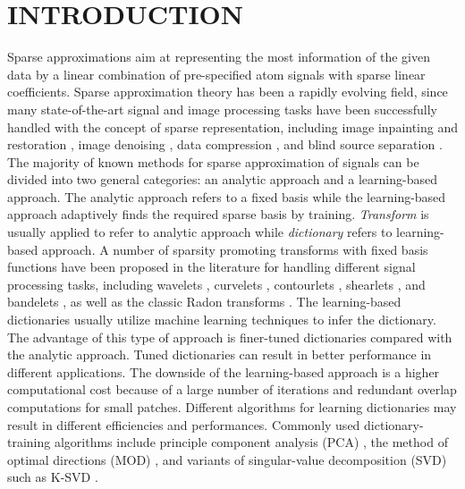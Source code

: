 \section{INTRODUCTION}
Sparse approximations aim at representing the most information of the given data by a linear combination of pre-specified atom signals with sparse linear coefficients. Sparse approximation theory has been a rapidly evolving field, since many state-of-the-art signal and image processing tasks have been successfully handled with the concept of sparse representation, including image inpainting and restoration \cite[]{elad2005,mairal2008,mairal2009,youli2011,jianfeng2013}, image denoising \cite[]{protter2009,jianfeng2013}, data compression \cite[]{bryt2008}, and blind source separation \cite[]{zib2001}. The majority of known methods for sparse approximation of signals can be divided into two general categories: an analytic approach and a learning-based approach. The analytic approach refers to a fixed basis while the learning-based approach adaptively finds the required sparse basis by training. \emph{Transform} is usually applied to refer to analytic approach while \emph{dictionary} refers to learning-based approach. A number of sparsity promoting transforms with fixed basis functions have been proposed in the literature for handling different signal processing tasks, including wavelets \cite[]{sweldens1995,mallat2009}, curvelets \cite[]{candes20061,jianwei2010}, contourlets \cite[]{do2005}, shearlets \cite[]{labate2005}, and bandelets \cite[]{lepennec2005}, as well as the classic Radon transforms \cite[]{amr2014,amr20142}. The learning-based dictionaries usually utilize machine learning techniques to infer the dictionary. The advantage of this type of approach is finer-tuned dictionaries compared with the analytic approach. Tuned dictionaries can result in better performance in different applications. The downside of the learning-based approach is a higher computational cost because of a large number of iterations and redundant overlap computations for small patches. Different algorithms for learning dictionaries may result in different efficiencies and performances. Commonly used dictionary-training algorithms include principle component analysis (PCA) \cite[]{jolliffe2002,vidal2005}, the method of optimal directions (MOD) \cite[]{engan1999}, and variants of singular-value decomposition (SVD) such as K-SVD \cite[]{aharon2006}. 

